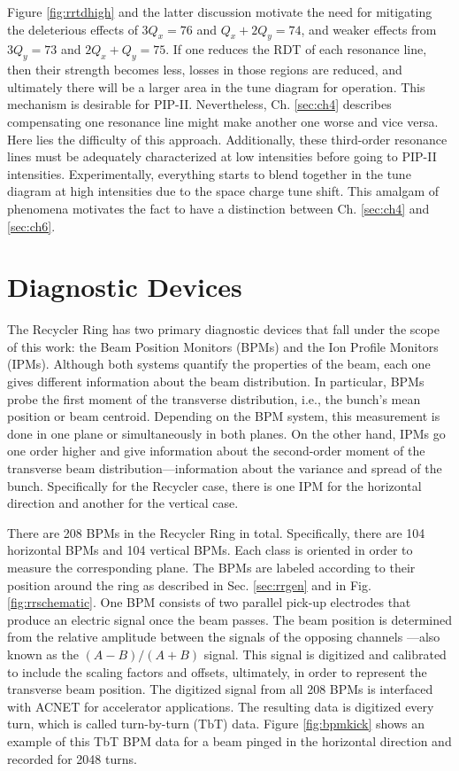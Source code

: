 Figure \ref{fig:rrtdhigh} and the latter discussion motivate the need for mitigating the deleterious effects of $3 Q_x=76$ and $Q_x+2Q_y=74$, and weaker effects from $3 Q_y=73$ and $2 Q_x+Q_y=75$. If one reduces the RDT of each resonance line, then their strength becomes less, losses in those regions are reduced, and ultimately there will be a larger area in the tune diagram for operation. This mechanism is desirable for PIP-II. Nevertheless, Ch. \ref{sec:ch4} describes compensating one resonance line might make another one worse and vice versa. Here lies the difficulty of this approach. Additionally, these third-order resonance lines must be adequately characterized at low intensities before going to PIP-II intensities. Experimentally, everything starts to blend together in the tune diagram at high intensities due to the space charge tune shift. This amalgam of phenomena motivates the fact to have a distinction between Ch. \ref{sec:ch4} and \ref{sec:ch6}.    

\section{\label{sec:diagnostic}Diagnostic Devices}

The Recycler Ring has two primary diagnostic devices that fall under the scope of this work: the Beam Position Monitors (BPMs) and the Ion Profile Monitors (IPMs). Although both systems quantify the properties of the beam, each one gives different information about the beam distribution. In particular, BPMs probe the first moment of the transverse distribution, i.e., the bunch's mean position or beam centroid. Depending on the BPM system, this measurement is done in one plane or simultaneously in both planes. On the other hand, IPMs go one order higher and give information about the second-order moment of the transverse beam distribution---information about the variance and spread of the bunch. Specifically for the Recycler case, there is one IPM for the horizontal direction and another for the vertical case.

There are 208 BPMs in the Recycler Ring in total. Specifically, there are 104 horizontal BPMs and 104 vertical BPMs. Each class is oriented in order to measure the corresponding plane. The BPMs are labeled according to their position around the ring as described in Sec. \ref{sec:rrgen} and in Fig. \ref{fig:rrschematic}. One BPM consists of two parallel pick-up electrodes that produce an electric signal once the beam passes. The beam position is determined from the relative amplitude between the signals of the opposing channels \cite{rrbpms}---also known as the $(A-B)/(A+B)$ signal. This signal is digitized and calibrated to include the scaling factors and offsets, ultimately, in order to represent the transverse beam position. The digitized signal from all 208 BPMs is interfaced with ACNET for accelerator applications. The resulting data is digitized every turn, which is called turn-by-turn (TbT) data. Figure \ref{fig:bpmkick} shows an example of this TbT BPM data for a beam pinged in the horizontal direction and recorded for 2048 turns.      

